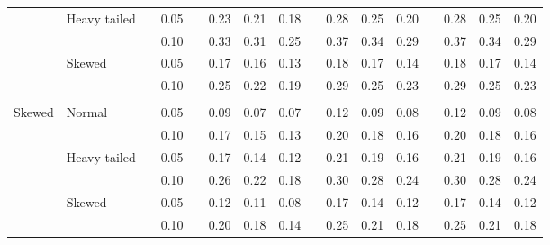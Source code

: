 \documentclass{article} %
\begin{document}
\begin{table}[ht]
\begin{scriptsize}
\begin{center}
\begin{tabular}{ll p{.1cm} c p{.1cm} rrr p{.1cm} rrr p{.1cm} rrr}
             & Heavy tailed && 0.05 &&   0.23 & 0.21 & 0.18 && 0.28 & 0.25 & 0.20 && 0.28 & 0.25 & 0.20 \\ 
             &              && 0.10 &&   0.33 & 0.31 & 0.25 && 0.37 & 0.34 & 0.29 && 0.37 & 0.34 & 0.29 \\ 
             & Skewed       && 0.05 &&   0.17 & 0.16 & 0.13 && 0.18 & 0.17 & 0.14 && 0.18 & 0.17 & 0.14 \\ 
             &              && 0.10 &&   0.25 & 0.22 & 0.19 && 0.29 & 0.25 & 0.23 && 0.29 & 0.25 & 0.23 \\ 
             &&&&&&&&&&&&&&&\\
Skewed       & Normal       && 0.05 &&   0.09 & 0.07 & 0.07 && 0.12 & 0.09 & 0.08 && 0.12 & 0.09 & 0.08 \\ 
             &              && 0.10 &&   0.17 & 0.15 & 0.13 && 0.20 & 0.18 & 0.16 && 0.20 & 0.18 & 0.16 \\ 
             & Heavy tailed && 0.05 &&   0.17 & 0.14 & 0.12 && 0.21 & 0.19 & 0.16 && 0.21 & 0.19 & 0.16 \\ 
             &              && 0.10 &&   0.26 & 0.22 & 0.18 && 0.30 & 0.28 & 0.24 && 0.30 & 0.28 & 0.24 \\ 
             & Skewed       && 0.05 &&   0.12 & 0.11 & 0.08 && 0.17 & 0.14 & 0.12 && 0.17 & 0.14 & 0.12 \\ 
             &              && 0.10 &&   0.20 & 0.18 & 0.14 && 0.25 & 0.21 & 0.18 && 0.25 & 0.21 & 0.18 \\ 



\end{tabular}
\end{center}
\end{scriptsize}
\end{table}
\end{document}
